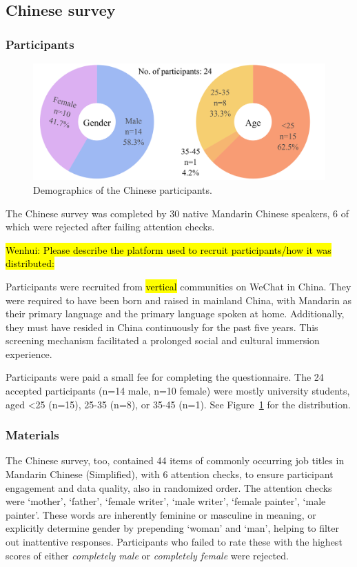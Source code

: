 \documentclass[11pt]{article}
\newcommand{\zh}[1]{\simplifiedchinesefont{#1}\rmfamily}
\begin{document}
\subsection{Chinese survey}

\subsubsection{Participants}

\begin{figure}[!ht]
  \centering
  \includegraphics[width=\linewidth]{../demographics_zh}
  \caption{Demographics of the Chinese participants.}
  \label{fig:demographics_zh}
\end{figure}

The Chinese survey was completed by 30 native Mandarin Chinese speakers, 6 of which were rejected after failing attention checks. 

\hl{Wenhui: Please describe the platform used to recruit participants/how it was distributed:}

Participants were recruited from \hl{vertical} communities on WeChat in China.  They were required to have been born and raised in mainland China, with Mandarin as their primary language and the primary language spoken at home. Additionally, they must have resided in China continuously for the past five years.  This screening mechanism facilitated a prolonged social and cultural immersion experience.

Participants were paid a small fee for completing the questionnaire. The 24 accepted participants (n=14 male, n=10 female) were mostly university students, aged <25 (n=15), 25-35 (n=8), or 35-45 (n=1). See Figure~\ref{fig:demographics_zh} for the distribution.

\subsubsection{Materials}

The Chinese survey, too, contained 44 items of commonly occurring job titles in Mandarin Chinese (Simplified), with 6 attention checks, to ensure participant engagement and data quality, also in randomized order. The attention checks were \zh{妈妈} `mother', \zh{爸爸} `father', \zh{女作家} `female writer', \zh{男作家} `male writer', \zh{女画家} `female painter', \zh{男画家} `male painter'. These words are inherently feminine or masculine in meaning, or explicitly determine gender by prepending \zh{女} `woman' and \zh{男} `man', helping to filter out inattentive responses. Participants who failed to rate these with the highest scores of either \textit{completely male} or \textit{completely female} were rejected.
\end{document}
